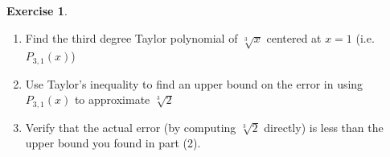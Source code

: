 \documentclass[
]{book}
\providecommand{\tightlist}{%
  \setlength{\itemsep}{0pt}\setlength{\parskip}{0pt}}
\theoremstyle{definition}
\theoremstyle{definition}
\theoremstyle{definition}
\newtheorem{exercise}{Exercise}[chapter]
\theoremstyle{definition}
\theoremstyle{remark}
\begin{document}
\begin{exercise}
\protect\hypertarget{exr:unlabeled-div-271}{}\label{exr:unlabeled-div-271}

\begin{enumerate}
\def\labelenumi{\arabic{enumi}.}
\tightlist
\item
  Find the third degree Taylor polynomial of \(\sqrt[3]{x}\) centered at \(x=1\) (i.e.~\(P_{3,1}(x)\))
\item
  Use Taylor's inequality to find an upper bound on the error in using \(P_{3,1}(x)\) to approximate \(\sqrt[3]{2}\)
\item
  Verify that the actual error (by computing \(\sqrt[3]{2}\) directly) is less than the upper bound you found in part (2).
\end{enumerate}

\end{exercise}
\end{document}
